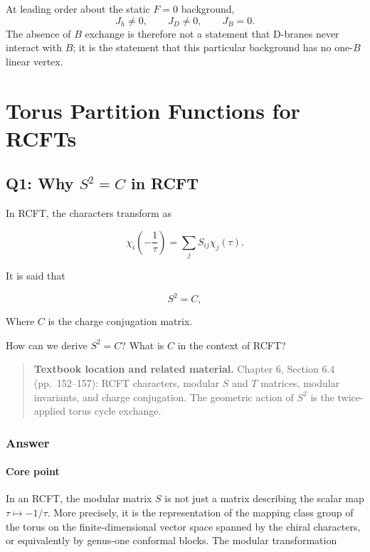 \documentclass[
  10pt,
  a4paper,
  openany]{book}
\begin{document}
At leading order about the static \(F=0\) background, \[
J_h\neq0,\qquad J_D\neq0,\qquad J_B=0.
\] The absence of \(B\) exchange is therefore not a statement that
D-branes never interact with \(B\); it is the statement that this
particular background has no one-\(B\) linear vertex.

\chapter{Torus Partition Functions for
RCFTs}\label{torus-partition-functions-for-rcfts-1}

\section{\texorpdfstring{Q1: Why \(S^2=C\) in
RCFT}{Q1: Why S\^{}2=C in RCFT}}\label{q1-why-s2c-in-rcft}

In RCFT, the characters transform as

\[
\chi_i\left(-\frac{1}{\tau}\right)
=
\sum_j S_{ij}\chi_j(\tau).
\]

It is said that

\[
S^2=C,
\]

Where \(C\) is the charge conjugation matrix.

How can we derive \(S^2=C\)? What is \(C\) in the context of RCFT?

\begin{quote}
\textbf{Textbook location and related material.} Chapter 6, Section 6.4
(pp.~152--157): RCFT characters, modular \(S\) and \(T\) matrices,
modular invariants, and charge conjugation. The geometric action of
\(S^2\) is the twice-applied torus cycle exchange.
\end{quote}

\subsection{Answer}\label{answer-3}

\subsubsection{Core point}\label{core-point-3}

In an RCFT, the modular matrix \(S\) is not just a matrix describing the
scalar map \(\tau \mapsto -1/\tau\). More precisely, it is the
representation of the mapping class group of the torus on the
finite-dimensional vector space spanned by the chiral characters, or
equivalently by genus-one conformal blocks. The modular transformation
\end{document}
